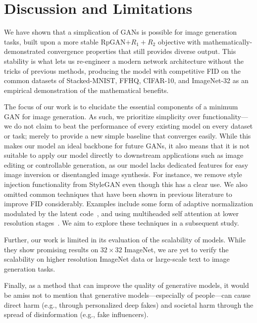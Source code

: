 \section{Discussion and Limitations}

We have shown that a simplication of GANs is possible for image generation tasks, built upon a more stable RpGAN$+ R_1 + R_2$ objective with mathematically-demonstrated convergence properties that still provides diverse output. This stability is what lets us re-engineer a modern network architecture without the tricks of previous methods, producing the \modelName model with competitive FID on the common datasets of Stacked-MNIST, FFHQ, CIFAR-10, and ImageNet-32 as an empirical demonstration of the mathematical benefits.

The focus of our work is to elucidate the essential components of a minimum GAN for image generation. 
As such, we prioritize simplicity over functionality---we do not claim to beat the performance of every existing model on every dataset or task; merely to provide a new simple baseline that converges easily.
While this makes our model an ideal backbone for future GANs, it also means that it is not suitable to apply our model directly to downstream applications such as image editing or controllable generation, as our model lacks dedicated features for easy image inversion or disentangled image synthesis. 
For instance, we remove style injection functionality from StyleGAN even though this has a clear use.
We also omitted common techniques that have been shown in previous literature to improve FID considerably. 
Examples include some form of adaptive normalization modulated by the latent code~\cite{adm,edm,sg1,zhang2022styleswin,dit}, and using multiheaded self attention at lower resolution stages~\cite{adm,edm,edm2}. 
We aim to explore these techniques in a subsequent study. 

Further, our work is limited in its evaluation of the scalability of \modelName models. While they show promising results on $32\times32$ ImageNet, we are yet to verify the scalability on higher resolution ImageNet data or large-scale text to image generation tasks.

Finally, as a method that can improve the quality of generative models, it would be amiss not to mention that generative models---especially of people---can cause direct harm (e.g., through personalized deep fakes) and societal harm through the spread of disinformation (e.g., fake influencers). 

\clearpage
